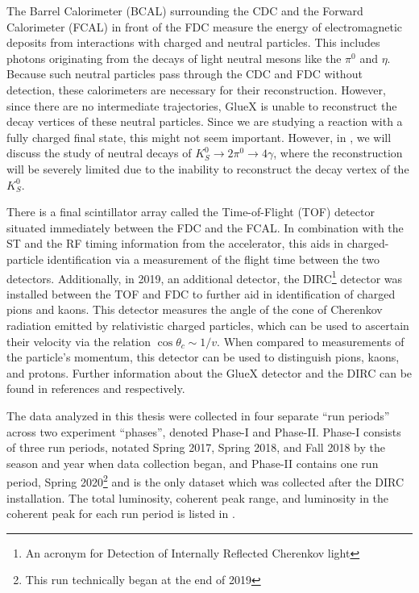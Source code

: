 The Barrel Calorimeter (BCAL) surrounding the CDC and the Forward Calorimeter (FCAL) in front of the FDC measure the energy of electromagnetic deposits from interactions with charged and neutral particles. This includes photons originating from the decays of light neutral mesons like the $\pi^0$ and $\eta$. Because such neutral particles pass through the CDC and FDC without detection, these calorimeters are necessary for their reconstruction. However, since there are no intermediate trajectories, GlueX is unable to reconstruct the decay vertices of these neutral particles. Since we are studying a reaction with a fully charged final state, this might not seem important. However, in , we will discuss the study of neutral decays of $K_S^0\to 2\pi^0 \to 4\gamma$, where the reconstruction will be severely limited due to the inability to reconstruct the decay vertex of the $K_S^0$.

There is a final scintillator array called the Time-of-Flight (TOF) detector situated immediately between the FDC and the FCAL. In combination with the ST and the RF timing information from the accelerator, this aids in charged-particle identification via a measurement of the flight time between the two detectors. Additionally, in 2019, an additional detector, the DIRC\footnote{An acronym for Detection of Internally Reflected Cherenkov light} detector was installed between the TOF and FDC to further aid in identification of charged pions and kaons. This detector measures the angle of the cone of Cherenkov radiation emitted by relativistic charged particles, which can be used to ascertain their velocity via the relation $\cos\theta_c \sim 1/v$. When compared to measurements of the particle's momentum, this detector can be used to distinguish pions, kaons, and protons. Further information about the GlueX detector and the DIRC can be found in references \cite{adhikari_gluex_2021} and \cite{ali_installation_2020} respectively.

The data analyzed in this thesis were collected in four separate ``run periods'' across two experiment ``phases'', denoted Phase-I and Phase-II. Phase-I consists of three run periods, notated Spring 2017, Spring 2018, and Fall 2018 by the season and year when data collection began, and Phase-II contains one run period, Spring 2020\footnote{This run technically began at the end of 2019} and is the only dataset which was collected after the DIRC installation. The total luminosity, coherent peak range, and luminosity in the coherent peak for each run period is listed in .


